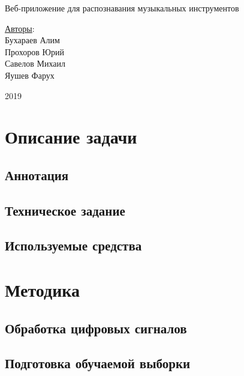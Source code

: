 \documentclass[14pt,a4paper]{article}
\begin{document}
\text{}
\vskip 8cm
\begin{center}
\begin{minipage}{0.8\textwidth}
\begin{center}
\Huge Веб-приложение для распознавания музыкальных инструментов
\end{center}
\end{minipage}
\end{center}

\vskip 7cm

\begin{flushright}
\Large \underline{Авторы}: \\
Бухараев Алим \\
Прохоров Юрий \\
Савелов Михаил \\
Яушев Фарух
\end{flushright}

\vskip 3.6cm

\begin{center}
2019
\end{center}

\newpage

\tableofcontents

\newpage 

\section{Описание задачи}

\subsection{Аннотация}
\subsection{Техническое задание}
\subsection{Используемые средства}

\newpage

\section{Методика}
\subsection{Обработка цифровых сигналов}
\subsection{Подготовка обучаемой выборки}
\end{document}
